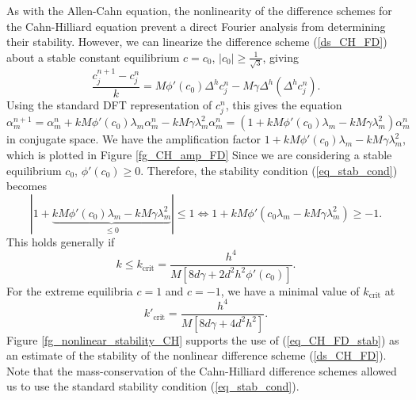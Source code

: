 \documentclass[12pt, reqno]{report}
\theoremstyle{definition}
\theoremstyle{remark}
\begin{document}
As with the Allen-Cahn equation, the nonlinearity of the difference schemes for the Cahn-Hilliard equation prevent a direct Fourier analysis from determining their stability.
However, we can linearize the difference scheme (\ref{ds_CH_FD}) about a stable constant equilibrium $c=c_{0}$, $|c_{0}|\ge \frac{1}{\sqrt{3}}$, giving 
\begin{equation} \label{ds_lin_CH_FD}
\frac{c_{j}^{n+1}-c_{j}^{n}}{k}=M\phi'(c_{0})\Delta^{h}c_{j}^{n}-M\gamma \Delta^{h}(\Delta^{h}c_{j}^{n}). \tag{lin-S5}
\end{equation}
Using the standard DFT representation of $c_{j}^{n}$, this gives the equation 
\begin{equation} 
    \alpha_{m}^{n+1}=\alpha_{m}^{n}+kM\phi'(c_{0})\lambda_{m}\alpha_{m}^{n}-kM\gamma \lambda_{m}^{2}\alpha_{m}^{n}=(1+kM\phi'(c_{0})\lambda_{m}-kM\gamma\lambda_{m}^{2})\alpha_{m}^{n}
\end{equation}
in conjugate space.
We have the amplification factor $1+kM\phi'(c_0)\lambda_m-kM\gamma\lambda^2_m$, which is plotted in Figure \ref{fg_CH_amp_FD}
Since we are considering a stable equilibrium $c_{0}$, $\phi'(c_{0})\ge0$. 
Therefore, the stability condition (\ref{eq_stab_cond}) becomes 
\begin{equation} 
    |1+\underbrace{kM\phi'(c_{0})\lambda_{m}-kM\gamma \lambda_{m}^{2}}_{\le0}|\le1\iff1+kM\phi'(c_{0}\lambda_{m}-kM\gamma \lambda_{m}^{2})\ge-1.
\end{equation}
This holds generally if 
\begin{equation} 
    k\le k_\text{crit}= \frac{h^{4}}{M[8d\gamma+2d^{2}h^{2}\phi'(c_{0})]}.
\end{equation}
For the extreme equilibria $c=1$ and $c=-1$, we have a minimal value of $k_\text{crit}$ at 
\begin{equation} \label{eq_CH_FD_stab}
k'_\text{crit}= \frac{h^{4}}{M[8d\gamma+4d^{2}h^{2}]}.
\end{equation}
Figure \ref{fg_nonlinear_stability_CH} supports the use of (\ref{eq_CH_FD_stab}) as an estimate of the stability of the nonlinear difference scheme (\ref{ds_CH_FD}).
Note that the mass-conservation of the Cahn-Hilliard difference schemes allowed us to use the standard stability condition (\ref{eq_stab_cond}).
\end{document}
